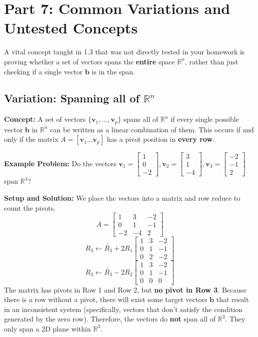 \documentclass[11pt]{article}
\begin{document}
\newpage
\section{Part 7: Common Variations and Untested Concepts}

A vital concept taught in 1.3 that was not directly tested in your homework is proving whether a set of vectors spans the \textbf{entire} space $\mathbb{R}^n$, rather than just checking if a single vector $\mathbf{b}$ is in the span.

\subsection{Variation: Spanning all of $\mathbb{R}^n$}
\textbf{Concept:} A set of vectors $\{\mathbf{v}_1, \dots, \mathbf{v}_p\}$ spans all of $\mathbb{R}^n$ if every single possible vector $\mathbf{b}$ in $\mathbb{R}^n$ can be written as a linear combination of them.
This occurs if and only if the matrix $A = [\mathbf{v}_1 \dots \mathbf{v}_p]$ has a pivot position in \textbf{every row}.

\textbf{Example Problem:} Do the vectors $\mathbf{v}_1 = \begin{bmatrix} 1 \\ 0 \\ -2 \end{bmatrix}, \mathbf{v}_2 = \begin{bmatrix} 3 \\ 1 \\ -4 \end{bmatrix}, \mathbf{v}_3 = \begin{bmatrix} -2 \\ -1 \\ 2 \end{bmatrix}$ span $\mathbb{R}^3$?

\textbf{Setup and Solution:}
We place the vectors into a matrix and row reduce to count the pivots.
\[ A = \begin{bmatrix} 1 & 3 & -2 \\ 0 & 1 & -1 \\ -2 & -4 & 2 \end{bmatrix} \]
\[ \underrightarrow{R_3 \leftarrow R_3 + 2R_1} \begin{bmatrix} 1 & 3 & -2 \\ 0 & 1 & -1 \\ 0 & 2 & -2 \end{bmatrix} \]
\[ \underrightarrow{R_3 \leftarrow R_3 - 2R_2} \begin{bmatrix} 1 & 3 & -2 \\ 0 & 1 & -1 \\ 0 & 0 & 0 \end{bmatrix} \]
The matrix has pivots in Row 1 and Row 2, but \textbf{no pivot in Row 3}. 
Because there is a row without a pivot, there will exist some target vectors $\mathbf{b}$ that result in an inconsistent system (specifically, vectors that don't satisfy the condition generated by the zero row). 
Therefore, the vectors do \textbf{not} span all of $\mathbb{R}^3$. They only span a 2D plane within $\mathbb{R}^3$.
\end{document}

